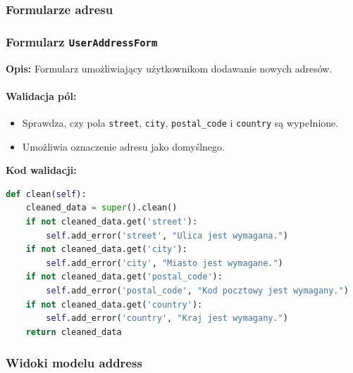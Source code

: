 \documentclass[12pt,a4paper,oneside]{article}
\theoremstyle{definition}
\numberwithin{equation}{section}
\begin{document}
\subsubsection{Formularze adresu}
\linespread{1.3}
\subsubsection*{Formularz \texttt{UserAddressForm}}


\textbf{Opis:}
Formularz umożliwiający użytkownikom dodawanie nowych adresów.

\paragraph{Walidacja pól:}
\begin{itemize}
    \item Sprawdza, czy pola \texttt{street}, \texttt{city}, \texttt{postal\_code} i \texttt{country} są wypełnione.
    \item Umożliwia oznaczenie adresu jako domyślnego.
\end{itemize}

\textbf{Kod walidacji:}
\begin{lstlisting}[language=Python, caption=Walidacja formularza \texttt{UserAddressForm}]
def clean(self):
    cleaned_data = super().clean()
    if not cleaned_data.get('street'):
        self.add_error('street', "Ulica jest wymagana.")
    if not cleaned_data.get('city'):
        self.add_error('city', "Miasto jest wymagane.")
    if not cleaned_data.get('postal_code'):
        self.add_error('postal_code', "Kod pocztowy jest wymagany.")
    if not cleaned_data.get('country'):
        self.add_error('country', "Kraj jest wymagany.")
    return cleaned_data
\end{lstlisting}



\subsubsection{Widoki modelu address}
\end{document}
